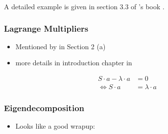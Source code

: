 A detailed example is given in section 3.3 of \citeauthor{brunton2019data}'s book  \cite{brunton2019data}.


\clearpage



\subsubsection{Lagrange Multipliers}

\begin{itemize}
	\item Mentioned by \cite{jolliffe2016principal} in Section 2 (a)
	\item more details in introduction chapter in \cite{Jolliffe2002book}
\end{itemize}

\begin{align}
	S \cdot a - \lambda \cdot a &= 0 \\
	\Leftrightarrow S \cdot a &= \lambda \cdot a
\end{align}

\clearpage


\subsubsection{Eigendecomposition}

\begin{itemize}
	\item Looks like a good wrapup: \cite{abdi2007eigen}
\end{itemize}

\clearpage

